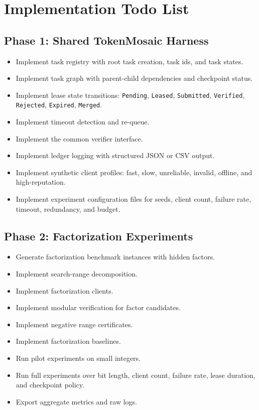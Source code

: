 \documentclass{article}
\theoremstyle{plain}
\begin{document}



\section{Implementation Todo List}

\subsection{Phase 1: Shared TokenMosaic Harness}

\begin{itemize}[leftmargin=*]
  \item Implement task registry with root task creation, task ids, and task states.
  \item Implement task graph with parent-child dependencies and checkpoint status.
  \item Implement lease state transitions: \texttt{Pending}, \texttt{Leased}, \texttt{Submitted}, \texttt{Verified}, \texttt{Rejected}, \texttt{Expired}, \texttt{Merged}.
  \item Implement timeout detection and re-queue.
  \item Implement the common verifier interface.
  \item Implement ledger logging with structured JSON or CSV output.
  \item Implement synthetic client profiles: fast, slow, unreliable, invalid, offline, and high-reputation.
  \item Implement experiment configuration files for seeds, client count, failure rate, timeout, redundancy, and budget.
\end{itemize}

\subsection{Phase 2: Factorization Experiments}

\begin{itemize}[leftmargin=*]
  \item Generate factorization benchmark instances with hidden factors.
  \item Implement search-range decomposition.
  \item Implement factorization clients.
  \item Implement modular verification for factor candidates.
  \item Implement negative range certificates.
  \item Implement factorization baselines.
  \item Run pilot experiments on small integers.
  \item Run full experiments over bit length, client count, failure rate, lease duration, and checkpoint policy.
  \item Export aggregate metrics and raw logs.
\end{itemize}
\end{document}
